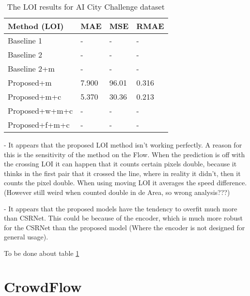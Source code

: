 \begin{table}[!htb]
	\begin{minipage}{.5\linewidth}
      \centering
		\begin{tabular}{llll}
		\hline
		Method (LOI)                               & MAE & MSE & RMAE \\ \hline
		\multicolumn{1}{l|}{Baseline 1}          & - & - & - \\
		\multicolumn{1}{l|}{Baseline 2}          & - & - & - \\
		\multicolumn{1}{l|}{Baseline 2+m}      & - & - & - \\
		\multicolumn{1}{l|}{Proposed+m}        	 & 7.900 & 96.01 & 0.316 \\
		\multicolumn{1}{l|}{Proposed+m+c}        & 5.370 & 30.36 & 0.213 \\
		\multicolumn{1}{l|}{Proposed+w+m+c}        & - & - & - \\
		\multicolumn{1}{l|}{Proposed+f+m+c}        & - & - & - \\ \hline
		\end{tabular}
		\caption{\label{tab:loi_aicity}The LOI results for AI City Challenge dataset}
	\end{minipage}
\end{table}


- It appears that the proposed LOI method isn't working perfectly. A reason for this is the sensitivity of the method on the Flow. When the prediction is off with the crossing LOI it can happen that it counts certain pixels double, because it thinks in the first pair that it crossed the line, where in reality it didn't, then it counts the pixel double. When using moving LOI it averages the speed difference. (However still weird when counted double in de Area, so wrong analysis???)

- It appears that the proposed models have the tendency to overfit much more than CSRNet. This could be because of the encoder, which is much more robust for the CSRNet than the proposed model (Where the encoder is not designed for general usage).

To be done about table \ref{tab:loi_aicity}


\section{CrowdFlow}

